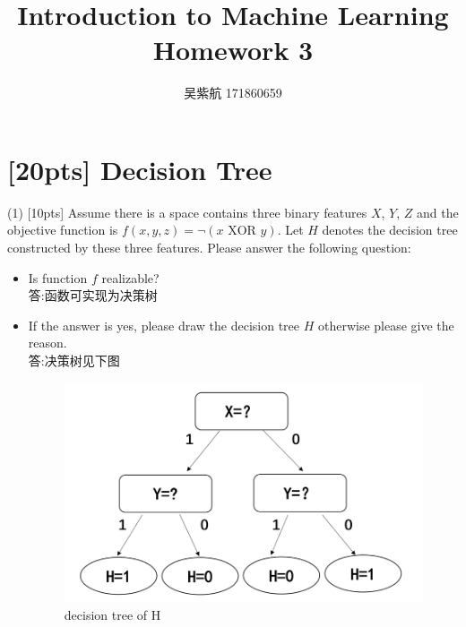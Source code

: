 \documentclass{article}
\title{Introduction to Machine Learning\\Homework 3}
\author{吴紫航 171860659}
\date{}
\begin{document}
	\maketitle
	
	\section{[20pts] Decision Tree}

	(1) [10pts] Assume there is a space contains three binary features $X$, $Y$, $Z$ and the objective function is $f(x,y,z)=\neg(x \text{ XOR } y)$. Let $H$ denotes the decision tree constructed by these three features. Please answer the following question:
	\begin{itemize}
		\item Is function $f$ realizable? 
		\\答:函数可实现为决策树
		\item If the answer is yes, please draw the decision tree $H$ otherwise please give the reason.\\
		答:决策树见下图
		\begin{figure}[htbp]
			\centering
			\includegraphics[scale=0.5]{decisionTree_1_1.png}
			\caption{decision tree of H}
		\end{figure}
	\end{itemize}
	
	
\end{document}
